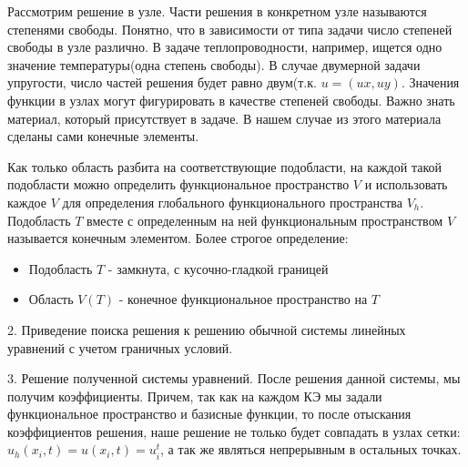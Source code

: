 Рассмотрим решение в узле. Части решения в конкретном узле называются степенями свободы.
Понятно, что в зависимости от типа задачи число степеней свободы
в узле различно. В задаче теплопроводности, например, ищется одно значение температуры(одна степень свободы)\cite{bib:thomas}.
В случае двумерной задачи упругости, число частей решения будет равно двум(т.к. $u=(ux, uy)$.
    Значения функции в узлах могут фигурировать в качестве степеней свободы\cite{bib:thomas}.
Важно знать материал, который присутствует в задаче. В нашем случае из этого материала 
сделаны сами конечные элементы.

Как только область разбита на соответствующие подобласти, на каждой такой подобласти можно 
определить функциональное пространство $V$ и использовать каждое $V$ для определения глобального
функционального пространства $V_h$. Подобласть $T$ вместе с определенным на ней функциональным пространством $V$ называется конечным элементом. Более строгое определение:

\begin{itemize}
    \item Подобласть $T$ - замкнута, с кусочно-гладкой границей
    \item Область $V(T)$ - конечное функциональное пространство на $T$
\end{itemize}

2. Приведение поиска решения к решению обычной системы линейных уравнений с учетом граничных условий.

3. Решение полученной системы уравнений.
После решения данной системы, мы получим коэффициенты. Причем, так как на каждом КЭ 
мы задали функциональное пространство и базисные функции, то после отыскания
коэффициентов решения, наше решение не только будет совпадать в узлах сетки: $u_h(x_i, t) = u(x_i, t) = u_i^t$,
а так же являться непрерывным в остальных точках\cite{bib:logg}.
